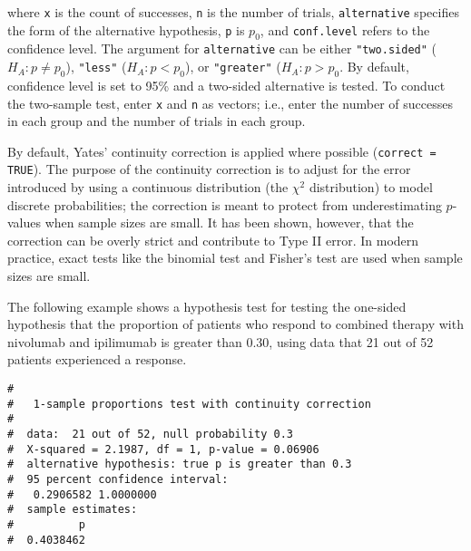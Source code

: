 \documentclass[letterpaper,12pt,twoside,]{pinp}
\begin{document}
where \texttt{x} is the count of successes, \texttt{n} is the number of
trials, \texttt{alternative} specifies the form of the alternative
hypothesis, \texttt{p} is \(p_0\), and \texttt{conf.level} refers to the
confidence level. The argument for \texttt{alternative} can be either
\texttt{"two.sided"} (\(H_A: p \neq p_0\)), \texttt{"less"}
(\(H_A: p < p_0\)), or \texttt{"greater"} (\(H_A: p > p_0\). By default,
confidence level is set to 95\% and a two-sided alternative is tested.
To conduct the two-sample test, enter \texttt{x} and \texttt{n} as
vectors; i.e., enter the number of successes in each group and the
number of trials in each group.

By default, Yates' continuity correction is applied where possible
(\texttt{correct = TRUE}). The purpose of the continuity correction is
to adjust for the error introduced by using a continuous distribution
(the \(\chi^2\) distribution) to model discrete probabilities; the
correction is meant to protect from underestimating \(p\)-values when
sample sizes are small. It has been shown, however, that the correction
can be overly strict and contribute to Type II error. In modern
practice, exact tests like the binomial test and Fisher's test are used
when sample sizes are small.

The following example shows a hypothesis test for testing the one-sided
hypothesis that the proportion of patients who respond to combined
therapy with nivolumab and ipilimumab is greater than 0.30, using data
that 21 out of 52 patients experienced a response.

\begin{Shaded}
\begin{Highlighting}[]
\NormalTok{(} \NormalTok{, } \NormalTok{, } \NormalTok{, } \NormalTok{, } \NormalTok{)}
\end{Highlighting}
\end{Shaded}

\begin{ShadedResult}
\begin{verbatim}
#  
#   1-sample proportions test with continuity correction
#  
#  data:  21 out of 52, null probability 0.3
#  X-squared = 2.1987, df = 1, p-value = 0.06906
#  alternative hypothesis: true p is greater than 0.3
#  95 percent confidence interval:
#   0.2906582 1.0000000
#  sample estimates:
#          p 
#  0.4038462
\end{verbatim}
\end{ShadedResult}
\end{document}
